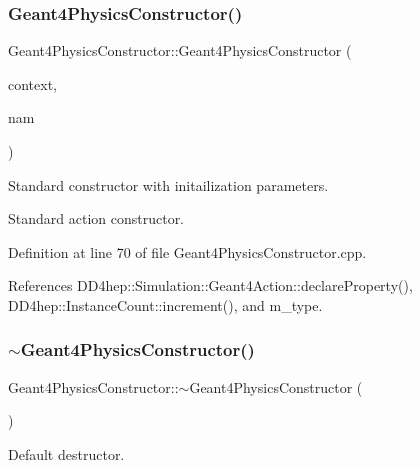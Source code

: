\subsubsection{\texorpdfstring{Geant4\+Physics\+Constructor()}{Geant4PhysicsConstructor()}}
{\footnotesize\ttfamily Geant4\+Physics\+Constructor\+::\+Geant4\+Physics\+Constructor (\begin{DoxyParamCaption}\item[{\hyperlink{class_d_d4hep_1_1_simulation_1_1_geant4_context}{Geant4\+Context} $\ast$}]{context,  }\item[{const std\+::string \&}]{nam }\end{DoxyParamCaption})}



Standard constructor with initailization parameters. 

Standard action constructor. 

Definition at line 70 of file Geant4\+Physics\+Constructor.\+cpp.



References D\+D4hep\+::\+Simulation\+::\+Geant4\+Action\+::declare\+Property(), D\+D4hep\+::\+Instance\+Count\+::increment(), and m\+\_\+type.

\hypertarget{class_d_d4hep_1_1_simulation_1_1_geant4_physics_constructor_af600587461631109af619f9f2b252653}{}\label{class_d_d4hep_1_1_simulation_1_1_geant4_physics_constructor_af600587461631109af619f9f2b252653} 
\subsubsection{\texorpdfstring{$\sim$\+Geant4\+Physics\+Constructor()}{~Geant4PhysicsConstructor()}}
{\footnotesize\ttfamily Geant4\+Physics\+Constructor\+::$\sim$\+Geant4\+Physics\+Constructor (\begin{DoxyParamCaption}{ }\end{DoxyParamCaption})\hspace{0.3cm}{\ttfamily [virtual]}}



Default destructor. 



